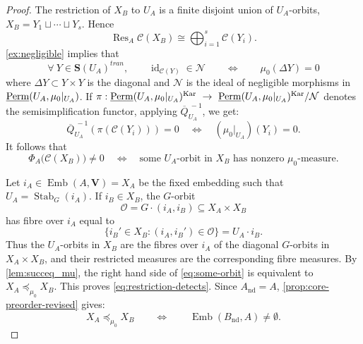 \documentclass[11pt,a4paper]{amsart}
\theoremstyle{plain}%
\theoremstyle{definition}
\theoremstyle{remark}
\newcommand{\Res}{\operatorname{Res}}
\newcommand{\id}{\operatorname{id}}
\newcommand{\Perm}{\underline{{\rm Perm}}}
\newcommand{\Kar}{\mathrm{Kar}}
\newcommand{\Emb}{\operatorname{Emb}}
\newcommand{\Stab}{\operatorname{Stab}}
\newcommand{\nd}{\mathrm{nd}}
\newcommand{\Set}[1]{\mathbf{S}(#1)}
\begin{document}
\begin{proof}
The restriction of $X_B$ to $U_A$ is a finite disjoint union of $U_A$-orbits,
$
 X_B=Y_1\sqcup\cdots\sqcup Y_s.$ 
Hence
\[
 \Res_A\mathcal{C}(X_B)\cong\bigoplus_{i=1}^s\mathcal{C}(Y_i).
\]
\cref{ex:negligible} implies that $$\forall ~Y\in \Set{U_A}^{tran}, \qquad \id_{\mathcal{C}(Y)}\in \mathcal{N} \qquad \Longleftrightarrow \qquad\mu_0(\Delta Y)=0$$ where $\Delta Y\subset Y\times Y$ is the diagonal and $\mathcal{N}$ is the ideal of negligible morphisms in $\Perm(U_A, \mu_0\rvert_{U_A})$. If $\pi: \Perm(U_A,\mu_0|_{U_A})^{\Kar}~\rightarrow~
 \Perm(U_A,\mu_0|_{U_A})^{\Kar}/\mathcal{N}$ denotes the semisimplification functor, applying  $\overline{Q}_{U_A}^{~-1}$, we get:
\[
 \overline{Q}_{U_A}^{~-1}(\pi(\mathcal{C}(Y_i)))=0
 \quad\Longleftrightarrow\quad
 (\mu_0|_{{U_A}})(Y_i)=0.
\]
It follows that
\begin{equation}\label{eq:some-orbit}
 \Phi_A\bigl(\mathcal{C}(X_B)\bigr)\neq0
 \quad\Longleftrightarrow\quad
 \text{some $U_A$-orbit in $X_B$ has nonzero $\mu_0$-measure.}
\end{equation}

Let $i_A\in \Emb(A, \mathbf{V}) = X_A$ be the fixed embedding such that $U_A = \Stab_G(i_A)$. If $i_B\in X_B$, the $G$-orbit
\[
 \mathcal O=G\cdot(i_A,i_B)\subseteq X_A\times X_B
\]
has fibre over $i_A$ equal to
\[
 \{i_B'\in X_B:(i_A,i_B')\in\mathcal O\}=U_A\cdot i_B.
\]
Thus the $U_A$-orbits in $X_B$ are the fibres over $i_A$ of the diagonal $G$-orbits in $X_A\times X_B$, and their restricted measures are the corresponding fibre measures.  By \cref{lem:succeq_mu}, the right hand side of \eqref{eq:some-orbit} is equivalent to $X_A\preceq_{\mu_0}X_B$. This proves \eqref{eq:restriction-detects}. Since $A_{\nd}=A$, \cref{prop:core-preorder-revised} gives: $$X_A\preceq_{\mu_0}X_B \qquad \Longleftrightarrow \qquad \Emb(B_{\nd}, A)\neq \emptyset.$$
\end{proof}
\end{document}
